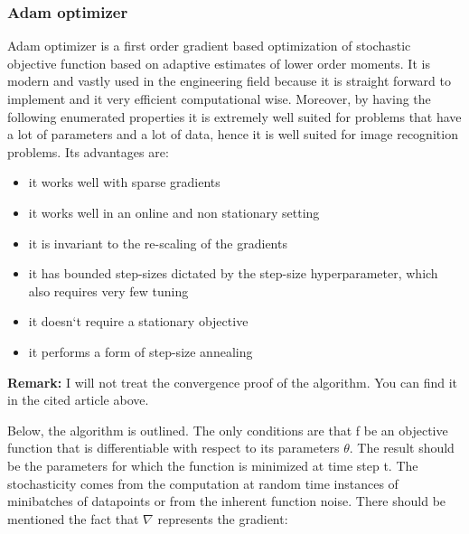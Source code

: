 \documentclass[12pt,a4paper,twoside]{report}
\begin{document}
\subsubsection{Adam optimizer}
Adam optimizer\cite{article-adam} is a first order gradient based optimization of stochastic objective function based on adaptive estimates of lower order moments. It is modern and vastly used in the engineering field because it is straight forward to implement and it very efficient computational wise. Moreover, by having the following enumerated properties it is extremely well suited for problems that have a lot of parameters and a lot of data, hence it is well suited for image recognition problems. Its advantages are:
\begin{itemize}
    \item it works well with sparse gradients
    \item it works well in an online and non stationary setting
    \item it is invariant to the re-scaling of the gradients
    \item it has bounded step-sizes dictated by the step-size hyperparameter, which also requires very few tuning
    \item it doesn`t require a stationary objective
    \item it performs a form of step-size annealing
\end{itemize}
\textbf{Remark:} I will not treat the convergence proof of the algorithm. You can find it in the cited article above.\par
Below, the algorithm is outlined. The only conditions are that f be an objective function that is differentiable with respect to its parameters $\theta$. The result should be the parameters for which the function is minimized at time step t. The stochasticity comes from the computation at random time instances of minibatches of datapoints or from the inherent function noise. There should be mentioned the fact that $\nabla$ represents the gradient:
\end{document}
